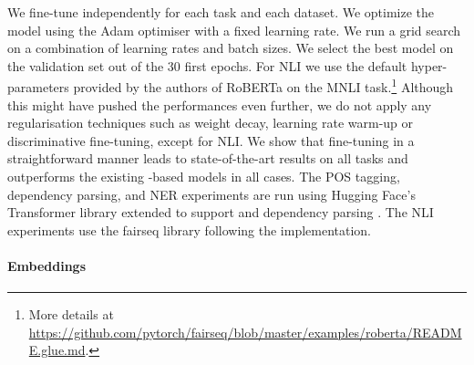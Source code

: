 We fine-tune \camembert independently for each task and each dataset. We optimize the model using the Adam optimiser \cite{kingma-ba-2015-adam} with a fixed learning rate. We run a grid search on a combination of learning rates and batch sizes. We select the best model on the validation set out of the 30 first epochs.
For NLI we use the default hyper-parameters provided by the authors of RoBERTa on the MNLI task.\footnote{More details at \url{https://github.com/pytorch/fairseq/blob/master/examples/roberta/README.glue.md}.}
Although this might have pushed the performances even further, we do not apply any regularisation techniques such as weight decay, learning rate warm-up or discriminative fine-tuning, except for NLI. We show that fine-tuning \camembert in a straightforward manner leads to state-of-the-art results on all tasks and outperforms the existing \bert-based models in all cases.
The POS tagging, dependency parsing, and NER experiments are run using Hugging Face's Transformer library extended to support \camembert and dependency parsing \cite{wolf-etal-2019-huggingface}.
The NLI experiments use the fairseq library following the \roberta implementation.


\paragraph{Embeddings}

